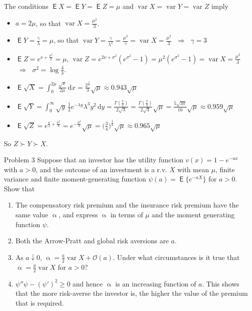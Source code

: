 \documentclass[10pt,handout]{beamer}
\newcommand{\ds}{\displaystyle}
\newcommand{\ie}{\;\Longrightarrow\;}
\DeclareMathOperator\expc{\mathsf{E}}
\DeclareMathOperator\var{var}
\theoremstyle{definition}
\begin{document}
\begin{frame}[allowframebreaks]
  The conditions $\expc X = \expc Y = \expc Z = \mu$ and $\var X = \var Y = \var Z$ imply 
  \begin{itemize}
    \item $a = 2\mu$, so that $\ds\var X = \frac{\mu^2}{3}$.
    \item $\ds\expc Y = \frac{\gamma}{\lambda} = \mu$, so that $\ds\var Y = \frac{\gamma}{\lambda^2} = \frac{\mu^2}{\gamma} = \var X = \frac{\mu^2}{3}$ $\ie$ $\gamma = 3$ 
    \item $\ds\expc Z = e^{\nu + \frac{\sigma^2}{2}} = \mu$, $\ds\var Z = e^{2\nu + \sigma^2}(e^{\sigma^2} - 1) = \mu^2(e^{\sigma^2} - 1) = \var X = \frac{\mu^2}{3}$ $\ie$ $\ds\sigma^2 = \log\frac{4}{3}$. 
  \end{itemize}
  \begin{itemize}
    \item $\ds\expc\sqrt{X} = \int_0^{2\mu}\frac{\sqrt{x}}{2\mu}\,\text{d}x = \frac{2^{\frac{3}{2}}}{3}\sqrt{\mu}\approx 0.943\sqrt{\mu}$
    \item $\ds\expc\sqrt{Y} = \int_0^\infty\sqrt{y}\,\frac{1}{2}e^{-\lambda y}\lambda^3 y^2\,\text{d}y = \frac{\Gamma(\frac{7}{2})}{2\sqrt{\lambda}} = \frac{\Gamma(\frac{7}{2})}{2\sqrt{3}}\sqrt{\mu} = \frac{5\sqrt{3\pi}}{16}\sqrt{\mu}\approx 0.959\sqrt{\mu}$
    \item $\ds\expc\sqrt{Z} = e^{\frac{\nu}{2} + \frac{\sigma^2}{8}} = e^{-\frac{\sigma^2}{8}}\sqrt{\mu} = \Big(\frac{3}{4}\Big)^{\frac{1}{8}}\sqrt{\mu}\approx 0.965\sqrt{\mu}$
  \end{itemize}
  So $Z\succ Y\succ X$.
\end{frame}

\begin{frame}{Problem 3}
  Suppose that an investor has the utility function $v(x) = 1 - e^{-a x}$ with $a > 0$, and the outcome of an investment is a r.v. $X$ with mean $\mu$, finite variance and finite moment-generating function $\psi(a) = \expc\big\{e^{-aX}\big\}$ for $a > 0$. Show that 
  \begin{enumerate}
    \item The compensatory risk premium and the insurance risk premium have the same value $\upalpha$, and express $\upalpha$ in terms of $\mu$ and the moment generating function $\psi$.
    \item Both the Arrow-Pratt and global risk aversions are $a$.
    \item As $a\downarrow 0$, $\ds\upalpha = \frac{a}{2}\var{X} + \mathcal{O}(a)$. Under what circumstances is it true that $\ds\upalpha = \frac{a}{2}\var{X}$ for $a > 0$?
    \item $\psi''\psi - (\psi')^2\geqslant 0$ and hence $\upalpha$ is an increasing function of $a$. This shows that the more risk-averse the investor is, the higher the value of the premium that is required.
  \end{enumerate}
\end{frame}
\end{document}
